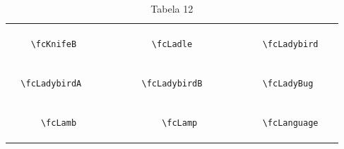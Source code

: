 \documentclass[x11names]{article}
\begin{document}
\begin{table}[H]
\begin{tabular}{|c|c|c|c|c|c|}
		&\multirow{5}{*}{	\fcKnifeB	[scale=0.16]} & &\multirow{5}{*}{	\fcLadle	[scale=0.16]} & &\multirow{5}{*}{	\fcLadybird	[scale=0.16]}\\	& & & & & \\	& & & & & \\	\verb|	\fcKnifeB	| & & \verb|	\fcLadle	| & & \verb|	\fcLadybird	| & \\	& & & & & \\	& & & & & \\	& & & & & \\	\hline									
		&\multirow{5}{*}{	\fcLadybirdA	[scale=0.16]} & &\multirow{5}{*}{	\fcLadybirdB	[scale=0.16]} & &\multirow{5}{*}{	\fcLadyBug	[scale=0.64]}\\	& & & & & \\	& & & & & \\	\verb|	\fcLadybirdA	| & & \verb|	\fcLadybirdB	| & & \verb|	\fcLadyBug	| & \\	& & & & & \\	& & & & & \\	& & & & & \\	\hline									
		&\multirow{5}{*}{	\fcLamb	[scale=0.16]} & &\multirow{5}{*}{	\fcLamp	[scale=0.16]} & &\multirow{5}{*}{	\fcLanguage	[scale=0.16]}\\	& & & & & \\	& & & & & \\	\verb|	\fcLamb	| & & \verb|	\fcLamp	| & & \verb|	\fcLanguage	| & \\	& & & & & \\	& & & & & \\	& & & & & \\		\hline 	\hline 	\end{tabular}	\caption{	Tabela 12	}\label{	Tab12	}\end{table}
\end{document}
